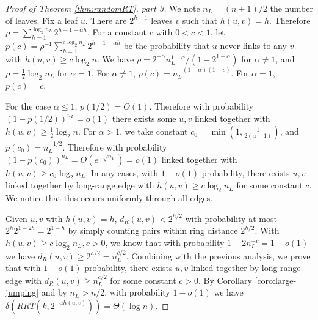 \documentclass[11pt]{article}
\begin{document}
\begin{proof}[Proof of Theorem \ref{thm:randomRT}, part 3]
We note $n_L = (n+1)/2$ the number of leaves.
Fix a leaf $u$. 
There are $2^{h-1}$ leaves $v$ such that $h(u,v)=h$. Therefore $\rho = \sum_{h=1}^{\log_2 n_L} 2^{h - 1 - \alpha h}$. For a constant $c$ with
	$0<c < 1$, let $p(c)=\rho^{-1}\sum_{h=1}^{c\log_2 n_L} 2^{h - 1 - \alpha h}$ be the probability that $u$ never links to any $v$ with $h(u,v) \geq c\log_2 n$.
We have $\rho = 2^{-\alpha}n_L^{1-\alpha} / (1 - 2^{1-\alpha})$ for $\alpha \neq 1$, and $\rho = \frac{1}{2}\log_2 n_L$ for $\alpha=1$. For $\alpha \neq 1$, $p(c)=n_L^{-(1-\alpha)(1-c)}$. For $\alpha = 1$, $p(c)=c$.

For the case $\alpha \leq 1$, $p(1/2)=O(1)$. Therefore with probability $(1-p(1/2))^{n_L}=o(1)$ there exists some $u,v$ linked together with $h(u,v) \geq \frac{1}{2}\log_2 n$. For $\alpha > 1$, we take constant $c_0 = \min(1, \frac{1}{2(\alpha-1)})$, and $p(c_0)=n_L^{-1/2}$. Therefore with probability $(1-p(c_0))^{n_L}=O(e^{-\sqrt{n_L}})=o(1)$ linked together with $h(u,v) \geq c_0\log_2 n_L$. In any cases, with $1-o(1)$ probability, there exists $u,v$ linked together by long-range edge with $h(u,v) \geq c\log_2 n_L$ for some constant $c$. We notice that this occurs uniformly through all edges.

Given $u,v$ with $h(u,v)=h$, $d_R(u,v) < 2^{h/2}$ with probability at most $2^{h}2^{1-2h}=2^{1-h}$ by simply counting pairs within ring distance $2^{h/2}$. With $h(u,v) \geq c\log_2 n_L, c>0$, we know that with probability $1 - 2n_L^{-c}=1-o(1)$ we have $d_R(u,v) \geq 2^{h/2} = n_L^{c/2}$. Combining with the previous analysis, we prove that with $1-o(1)$ probability, there exists $u,v$ linked together by long-range edge with $d_R(u,v) \geq n_L^{c/2}$ for some constant $c>0$. By Corollary \ref{coro:large-jumping} and by $n_L > n/2$, with probability $1-o(1)$ we have $\delta(RRT(k,2^{-\alpha h(u,v)}))=\Theta(\log n)$.
\end{proof}



\end{document}
